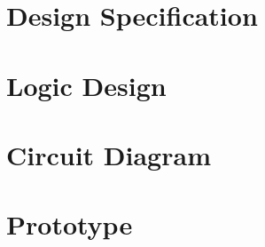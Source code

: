 \section{Design Specification}

\section{Logic Design}

\section{Circuit Diagram}

\section{Prototype}

